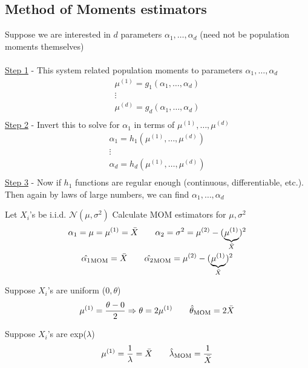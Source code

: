 \subsection*{Method of Moments estimators}
Suppose we are interested in $d$ parameters $\alpha_1, \ldots, \alpha_d$ (need not be population moments themselves)\\\\
\underline{Step 1} - This system related population moments to parameters $\alpha_1, \ldots, \alpha_d$
\begin{gather*}
	\mu^{(1)} = g_1(\alpha_1, \ldots, \alpha_d)\\
	\vdots\\
	\mu^{(d)} = g_d(\alpha_1, \ldots, \alpha_d)\\
\end{gather*}
\underline{Step 2} - Invert this to solve for $\alpha_1$ in terms of $\mu^{(1)}, \ldots, \mu^{(d)}$
\begin{gather*}
	\alpha_1 = h_1(\mu^{(1)}, \ldots, \mu^{(d)})\\
	\vdots\\
	\alpha_d = h_d(\mu^{(1)}, \ldots, \mu^{(d)})\\
\end{gather*}
\underline{Step 3} - Now if $h_1$ functions are regular enough (continuous, differentiable, etc.). Then again by laws of large numbers, we can find $\alpha_1, \ldots, \alpha_d$
\begin{example-N}
	Let $X_i$'s be i.i.d. $\mathcal{N}(\mu, \sigma^2)$ Calculate MOM estimators for $\mu, \sigma^2$
	\begin{gather*}
		\alpha_1 = \mu = \mu^{(1)} = \bar{X} \qquad \alpha_2 = \sigma^2 = \mu^{(2)} - (\underbrace{\mu^{(1)} }_{\bar{X}})^2\\
		\hat{\alpha_1}_{\text{MOM}} = \bar{X} \qquad \hat{\alpha_2}_{\text{MOM}} = \mu^{(2)} - (\underbrace{\mu^{(1)} }_{\bar{X}})^2
	\end{gather*}
\end{example-N}
\begin{example-N} Suppose $X_i$'s are uniform ($0, \theta$)
\begin{gather*}
	\mu^{(1)} = \frac{\theta - 0}{2} \Rightarrow \theta = 2 \mu^{(1)} \qquad \hat{\theta}_{\text{MOM}} =2 \bar{X}
\end{gather*}
\end{example-N}
\begin{example-N} Suppose $X_i$'s are exp($\lambda$)
\begin{gather*}
	\mu^{(1)} = \frac{1}{\lambda} = \bar{X} \qquad \hat{\lambda}_{\text{MOM}} = \frac{1}{\bar{X}}
\end{gather*}
\end{example-N}
